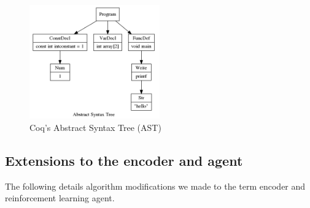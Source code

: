 \documentclass{article}
\begin{document}
   \begin{figure}[H]
        \centering
        \includegraphics[width=0.5\textwidth]{images/coq-ast.png}
        \caption{Coq's Abstract Syntax Tree (AST) \cite{coqgym}}
        \label{fig:coq_ast}
    \end{figure}

    
\subsection{Extensions to the encoder and agent}
The following details algorithm modifications we made to the term encoder and reinforcement learning agent.

\end{document}
